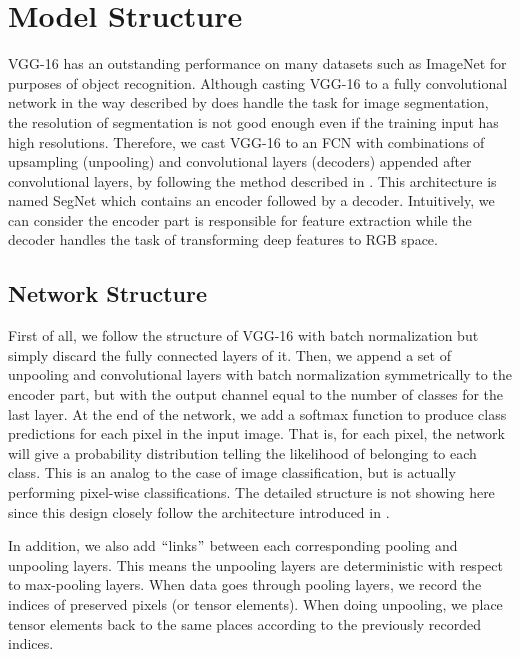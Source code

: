 \documentclass[10pt,twocolumn,letterpaper]{article}
\begin{document}
\section{Model Structure}
VGG-16 \cite{Simonyan14c} has an outstanding performance on many datasets such as ImageNet for purposes of object recognition. Although casting VGG-16 to a fully convolutional network in the way described by \cite{Long_2015_CVPR} does handle the task for image segmentation, the resolution of segmentation is not good enough even if the training input has high resolutions. Therefore, we cast VGG-16 to an FCN with combinations of upsampling (unpooling) and convolutional layers (decoders) appended after convolutional layers, by following the method described in \cite{badrinarayanan2015segnet2}. This architecture is named SegNet which contains an encoder followed by a decoder. Intuitively, we can consider the encoder part is responsible for feature extraction while the decoder handles the task of transforming deep features to RGB space.

\subsection{Network Structure}
First of all, we follow the structure of VGG-16 with batch normalization \cite{ioffe2015batch} but simply discard the fully connected layers of it. Then, we append a set of unpooling and convolutional layers with batch normalization symmetrically to the encoder part, but with the output channel equal to the number of classes for the last layer. At the end of the network, we add a softmax function to produce class predictions for each pixel in the input image. That is, for each pixel, the network will give a probability distribution telling the likelihood of belonging to each class. This is an analog to the case of image classification, but is actually performing pixel-wise classifications. The detailed structure is not showing here since this design closely follow the architecture introduced in \cite{badrinarayanan2015segnet2}.

In addition, we also add $``$links$"$ between each corresponding pooling and unpooling layers. This means the unpooling layers are deterministic with respect to max-pooling layers. When data goes through pooling layers, we record the indices of preserved pixels (or tensor elements). When doing unpooling, we place tensor elements back to the same places according to the previously recorded indices.
\end{document}
